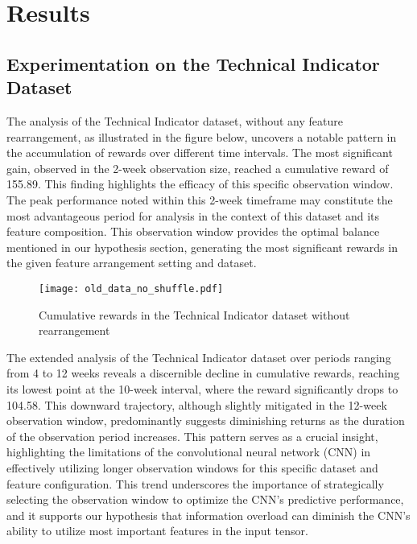 
\FloatBarrier
\section{Results}
\subsection{Experimentation on the Technical Indicator Dataset}
The analysis of the Technical Indicator dataset, without any feature rearrangement, as illustrated in the figure below, uncovers a notable pattern in the accumulation of rewards over different time intervals. The most significant gain, observed in the 2-week observation size, reached a cumulative reward of 155.89. This finding highlights the efficacy of this specific observation window. The peak performance noted within this 2-week timeframe may constitute the most advantageous period for analysis in the context of this dataset and its feature composition. This observation window provides the optimal balance mentioned in our hypothesis section, generating the most significant rewards in the given feature arrangement setting and dataset.

\begin{figure}[ht]
\centering
\texttt{[image: old\_data\_no\_shuffle.pdf]}
\caption{Cumulative rewards in the Technical Indicator dataset without rearrangement }
\label{fig:tech_indicator_not_rearranged}
\end{figure}

The extended analysis of the Technical Indicator dataset over periods ranging from 4 to 12 weeks reveals a discernible decline in cumulative rewards, reaching its lowest point at the 10-week interval, where the reward significantly drops to 104.58. This downward trajectory, although slightly mitigated in the 12-week observation window, predominantly suggests diminishing returns as the duration of the observation period increases. This pattern serves as a crucial insight, highlighting the limitations of the convolutional neural network (CNN) in effectively utilizing longer observation windows for this specific dataset and feature configuration. This trend underscores the importance of strategically selecting the observation window to optimize the CNN's predictive performance, and it supports our hypothesis that information overload can diminish the CNN's ability to utilize most important features in the input tensor.

